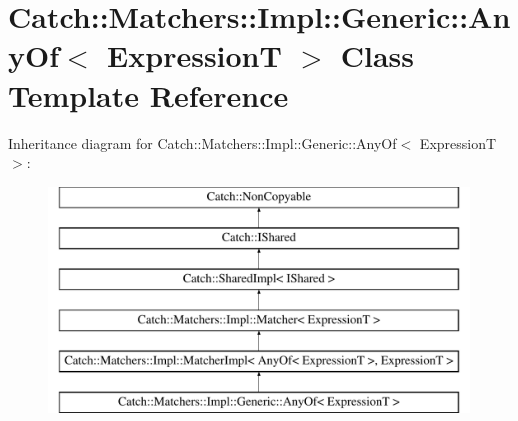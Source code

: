 \hypertarget{class_catch_1_1_matchers_1_1_impl_1_1_generic_1_1_any_of}{\section{Catch\-:\-:Matchers\-:\-:Impl\-:\-:Generic\-:\-:Any\-Of$<$ Expression\-T $>$ Class Template Reference}
\label{class_catch_1_1_matchers_1_1_impl_1_1_generic_1_1_any_of}
}
Inheritance diagram for Catch\-:\-:Matchers\-:\-:Impl\-:\-:Generic\-:\-:Any\-Of$<$ Expression\-T $>$\-:\begin{figure}[H]
\begin{center}
\leavevmode
\includegraphics[height=6.000000cm]{class_catch_1_1_matchers_1_1_impl_1_1_generic_1_1_any_of}
\end{center}
\end{figure}
